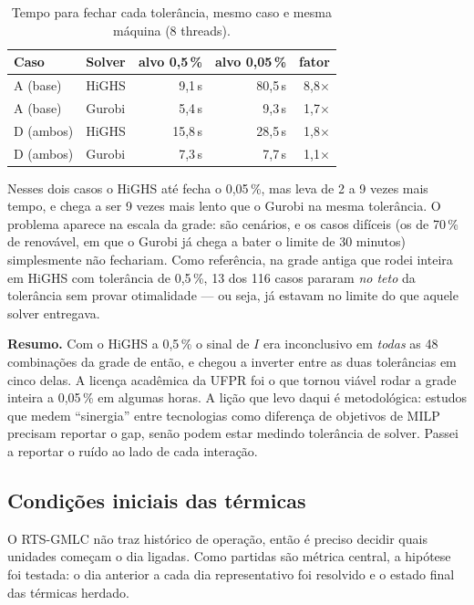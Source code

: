 \documentclass[11pt,a4paper]{article}
\begin{document}
\begin{table}[htbp]
\centering\small
\caption{Tempo para fechar cada tolerância, mesmo caso e mesma máquina (8 threads).}
\begin{tabular}{@{}llrrr@{}}
\toprule
Caso & Solver & alvo 0{,}5\,\% & alvo 0{,}05\,\% & fator \\
\midrule
A (base)  & HiGHS  & 9{,}1\,s  & 80{,}5\,s & 8{,}8$\times$ \\
A (base)  & Gurobi & 5{,}4\,s  & 9{,}3\,s  & 1{,}7$\times$ \\
D (ambos) & HiGHS  & 15{,}8\,s & 28{,}5\,s & 1{,}8$\times$ \\
D (ambos) & Gurobi & 7{,}3\,s  & 7{,}7\,s  & 1{,}1$\times$ \\
\bottomrule
\end{tabular}
\end{table}

Nesses dois casos o HiGHS até fecha o 0{,}05\,\%, mas leva de 2 a 9 vezes mais tempo, e chega a ser
9 vezes mais lento que o Gurobi na mesma tolerância. O problema aparece na escala da grade: são
\numncen{} cenários, e os casos difíceis (os de 70\,\% de renovável, em que o Gurobi já chega a bater o
limite de 30 minutos) simplesmente não fechariam. Como referência, na grade antiga que rodei inteira em
HiGHS com tolerância de 0{,}5\,\%, 13 dos 116 casos pararam \emph{no teto} da tolerância sem provar
otimalidade --- ou seja, já estavam no limite do que aquele solver entregava.

\textbf{Resumo.} Com o HiGHS a 0{,}5\,\% o sinal de $I$ era inconclusivo em \emph{todas} as 48
combinações da grade de então, e chegou a inverter entre as duas tolerâncias em cinco delas. A licença acadêmica da UFPR
foi o que tornou viável rodar a grade inteira a 0{,}05\,\% em algumas horas. A lição que levo daqui é
metodológica: estudos que medem ``sinergia'' entre tecnologias como diferença de objetivos de MILP
precisam reportar o gap, senão podem estar medindo tolerância de solver. Passei a reportar o ruído ao
lado de cada interação.

\subsection{Condições iniciais das térmicas}

O RTS-GMLC não traz histórico de operação, então é preciso decidir quais unidades começam o dia ligadas.
Como partidas são métrica central, a hipótese foi testada: o dia anterior a cada dia representativo foi
resolvido e o estado final das térmicas herdado.
\end{document}
